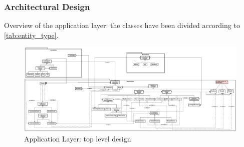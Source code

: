 \subsubsection{Architectural Design}
Overview of the application layer: the classes have been divided according to 
\ref{tab:entity_type}.
\begin{figure}[H]
  \centering
  \includegraphics[width=.95\columnwidth]{images/solution/app_architecture.eps}
  \caption{Application Layer: top level design}
  \label{fig:sd-app-architecture}
\end{figure}


